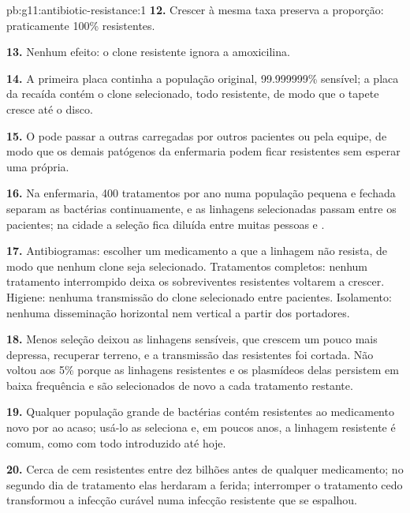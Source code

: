 \begin{solution}{pb:g11:antibiotic-resistance:1}
\textbf{12.} Crescer à mesma taxa preserva a proporção: praticamente
100\% resistentes.

\textbf{13.} Nenhum efeito: o clone resistente ignora a amoxicilina.

\textbf{14.} A primeira placa continha a população original,
99.999999\% sensível; a placa da recaída contém o clone selecionado,
todo resistente, de modo que o tapete cresce até o disco.

\textbf{15.} O  pode passar a outras  carregadas por outros
pacientes ou pela equipe, de modo que os demais patógenos da enfermaria
podem ficar resistentes sem esperar uma  própria.

\textbf{16.} Na enfermaria, 400 tratamentos por ano numa população
pequena e fechada separam as bactérias continuamente, e as linhagens
selecionadas passam entre os pacientes; na cidade a seleção fica
diluída entre muitas pessoas e .

\textbf{17.} Antibiogramas: escolher um medicamento a que a linhagem
não resista, de modo que nenhum clone seja selecionado. Tratamentos
completos: nenhum tratamento interrompido deixa os sobreviventes
resistentes voltarem a crescer. Higiene: nenhuma transmissão do clone
selecionado entre pacientes. Isolamento: nenhuma disseminação
horizontal nem vertical a partir dos portadores.

\textbf{18.} Menos seleção deixou as linhagens sensíveis, que crescem
um pouco mais depressa, recuperar terreno, e a transmissão das
resistentes foi cortada. Não voltou aos 5\% porque as linhagens
resistentes e os plasmídeos delas persistem em baixa frequência e são
selecionados de novo a cada tratamento restante.

\textbf{19.} Qualquer população grande de bactérias contém 
resistentes ao medicamento novo por  ao acaso; usá-lo as
seleciona e, em poucos anos, a linhagem resistente é comum, como com
todo  introduzido até hoje.

\textbf{20.} Cerca de cem  resistentes entre dez bilhões antes
de qualquer medicamento; no segundo dia de tratamento elas herdaram a
ferida; interromper o tratamento cedo transformou a infecção curável
numa infecção resistente que se espalhou.
\end{solution}
